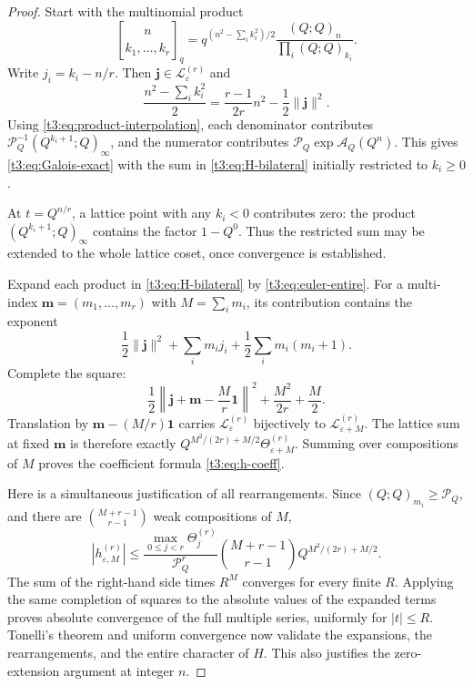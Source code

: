 \documentclass[11pt,openany]{book}
\numberwithin{equation}{chapter}
\theoremstyle{plain}
\theoremstyle{definition}
\theoremstyle{remark}
\newcommand{\pp}[1]{(Q;Q)_{#1}}
\newcommand{\Pinf}{\mathcal P_Q}
\newcommand{\A}{\mathcal A_Q}
\newcommand{\eps}{\varepsilon}
\newcommand{\T}{\Theta}
\begin{document}
\begin{proof}
Start with the multinomial product
\[
 \genfrac{[}{]}{0pt}{}{n}{k_1,\ldots,k_r}_q
 =q^{(n^2-\sum_i k_i^2)/2}
     \frac{\pp{n}}{\prod_i\pp{k_i}}.
\]
Write $j_i=k_i-n/r$. Then $\boldsymbol j\in\mathcal L_{\eps}^{(r)}$ and
\begin{equation}\label{t3:eq:quadratic-completion}
 \frac{n^2-\sum_i k_i^2}{2}
 =\frac{r-1}{2r}n^2-\frac12\|\boldsymbol j\|^2.
\end{equation}
Using \eqref{t3:eq:product-interpolation}, each denominator contributes
$\Pinf^{-1}(Q^{k_i+1};Q)_\infty$, and the numerator contributes
$\Pinf\exp\A(Q^n)$. This gives \eqref{t3:eq:Galois-exact} with the sum in \eqref{t3:eq:H-bilateral} initially restricted to $k_i\ge0$.

At $t=Q^{n/r}$, a lattice point with any $k_i<0$ contributes zero: the product $(Q^{k_i+1};Q)_\infty$ contains the factor $1-Q^0$. Thus the restricted sum may be extended to the whole lattice coset, once convergence is established.

Expand each product in \eqref{t3:eq:H-bilateral} by \eqref{t3:eq:euler-entire}. For a multi-index $\boldsymbol m=(m_1,\ldots,m_r)$ with $M=\sum_i m_i$, its contribution contains the exponent
\[
 \frac12\|\boldsymbol j\|^2
 +\sum_i m_i j_i+\frac12\sum_i m_i(m_i+1).
\]
Complete the square:
\begin{equation}\label{t3:eq:theta-complete}
 \frac12\left\|\boldsymbol j+\boldsymbol m-\frac Mr\boldsymbol1\right\|^2
 +\frac{M^2}{2r}+\frac M2.
\end{equation}
Translation by $\boldsymbol m-(M/r)\boldsymbol1$ carries
$\mathcal L_{\eps}^{(r)}$ bijectively to $\mathcal L_{\eps+M}^{(r)}$.
The lattice sum at fixed $\boldsymbol m$ is therefore exactly
$Q^{M^2/(2r)+M/2}\T_{\eps+M}^{(r)}$.
Summing over compositions of $M$ proves the coefficient formula \eqref{t3:eq:h-coeff}.

Here is a simultaneous justification of all rearrangements. Since
$\pp{m_i}\ge\Pinf$, and there are $\binom{M+r-1}{r-1}$ weak compositions of $M$,
\begin{equation}\label{t3:eq:H-bound}
 |h_{\eps,M}^{(r)}|
 \le\frac{\max_{0\le j<r}\T_j^{(r)}}{\Pinf^r}
 \binom{M+r-1}{r-1}Q^{M^2/(2r)+M/2}.
\end{equation}
The sum of the right-hand side times $R^M$ converges for every finite $R$. Applying the same completion of squares to the absolute values of the expanded terms proves absolute convergence of the full multiple series, uniformly for $|t|\le R$. Tonelli's theorem and uniform convergence now validate the expansions, the rearrangements, and the entire character of $H$. This also justifies the zero-extension argument at integer $n$.
\end{proof}
\end{document}

